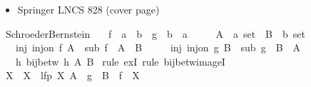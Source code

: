 \begin{isabellebody}
\begin{isamarkuptext}
\begin{itemize}
\item Springer LNCS 828 (cover page)%
\end{itemize}%
\end{isamarkuptext}\isamarkuptrue%
\isamarkupfalse%
\ Schroeder{\isacharunderscore}{\kern0pt}Bernstein{\isacharcolon}{\kern0pt}\isanewline
\ \ \ f\ {\isacharcolon}{\kern0pt}{\isacharcolon}{\kern0pt}\ {\isachardoublequoteopen}{\isacharprime}{\kern0pt}a\ {\isasymRightarrow}\ {\isacharprime}{\kern0pt}b{\isachardoublequoteclose}\ \ g\ {\isacharcolon}{\kern0pt}{\isacharcolon}{\kern0pt}\ {\isachardoublequoteopen}{\isacharprime}{\kern0pt}b\ {\isasymRightarrow}\ {\isacharprime}{\kern0pt}a{\isachardoublequoteclose}\isanewline
\ \ \ \ \ A\ {\isacharcolon}{\kern0pt}{\isacharcolon}{\kern0pt}\ {\isachardoublequoteopen}{\isacharprime}{\kern0pt}a\ set{\isachardoublequoteclose}\ \ B\ {\isacharcolon}{\kern0pt}{\isacharcolon}{\kern0pt}\ {\isachardoublequoteopen}{\isacharprime}{\kern0pt}b\ set{\isachardoublequoteclose}\isanewline
\ \ \ inj{}{\isacharcolon}{\kern0pt}\ {\isachardoublequoteopen}inj{\isacharunderscore}{\kern0pt}on\ f\ A{\isachardoublequoteclose}\ \ sub{}{\isacharcolon}{\kern0pt}\ {\isachardoublequoteopen}f\ {\isacharbackquote}{\kern0pt}\ A\ {\isasymsubseteq}\ B{\isachardoublequoteclose}\isanewline
\ \ \ \ \ inj{}{\isacharcolon}{\kern0pt}\ {\isachardoublequoteopen}inj{\isacharunderscore}{\kern0pt}on\ g\ B{\isachardoublequoteclose}\ \ sub{}{\isacharcolon}{\kern0pt}\ {\isachardoublequoteopen}g\ {\isacharbackquote}{\kern0pt}\ B\ {\isasymsubseteq}\ A{\isachardoublequoteclose}\isanewline
\ \ \ {\isachardoublequoteopen}{\isasymexists}h{\isachardot}{\kern0pt}\ bij{\isacharunderscore}{\kern0pt}betw\ h\ A\ B{\isachardoublequoteclose}\isanewline
%
\isadelimproof
%
\endisadelimproof
%
\isatagproof
{}\isamarkupfalse%
\ {\isacharparenleft}{\kern0pt}rule\ exI{\isacharcomma}{\kern0pt}\ rule\ bij{\isacharunderscore}{\kern0pt}betw{\isacharunderscore}{\kern0pt}imageI{\isacharparenright}{\kern0pt}\isanewline
\ \ \isamarkupfalse%
\ X\ \ {\isachardoublequoteopen}X\ {\isacharequal}{\kern0pt}\ lfp\ {\isacharparenleft}{\kern0pt}{\isasymlambda}X{\isachardot}{\kern0pt}\ A\ {\isacharminus}{\kern0pt}\ {\isacharparenleft}{\kern0pt}g\ {\isacharbackquote}{\kern0pt}\ {\isacharparenleft}{\kern0pt}B\ {\isacharminus}{\kern0pt}\ {\isacharparenleft}{\kern0pt}f\ {\isacharbackquote}{\kern0pt}\ X{\isacharparenright}{\kern0pt}{\isacharparenright}{\kern0pt}{\isacharparenright}{\kern0pt}{\isacharparenright}{\kern0pt}{\isachardoublequoteclose}\isanewline

\end{isabellebody}
